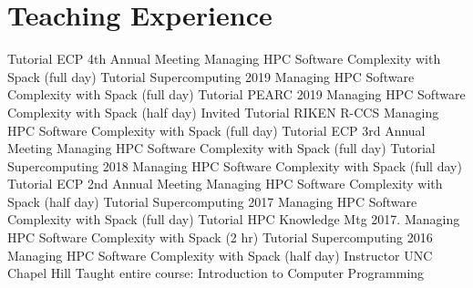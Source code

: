 \section{Teaching Experience}
		{Tutorial}
		{ECP 4th Annual Meeting}{}
		{Managing HPC Software Complexity with Spack (full day)}{}
		{Tutorial}
		{Supercomputing 2019}{}
		{Managing HPC Software Complexity with Spack (full day)}{}
		{Tutorial}
		{PEARC 2019}{}
		{Managing HPC Software Complexity with Spack (half day)}{}
		{Invited Tutorial}
		{RIKEN R-CCS}{}
		{Managing HPC Software Complexity with Spack (full day)}{}
		{Tutorial}
		{ECP 3rd Annual Meeting}{}
		{Managing HPC Software Complexity with Spack (full day)}{}
		{Tutorial}
		{Supercomputing 2018}{}
		{Managing HPC Software Complexity with Spack (full day)}{}
		{Tutorial}
		{ECP 2nd Annual Meeting}{}
		{Managing HPC Software Complexity with Spack (half day)}{}
		{Tutorial}
		{Supercomputing 2017}{}
		{Managing HPC Software Complexity with Spack (full day)}{}
		{Tutorial}
		{HPC Knowledge Mtg 2017.}{}
		{Managing HPC Software Complexity with Spack (2 hr)}{}
		{Tutorial}
		{Supercomputing 2016}{}
		{Managing HPC Software Complexity with Spack (half day)}{}
		{Instructor}
		{UNC Chapel Hill}{}
		{Taught entire course: Introduction to Computer Programming}{}
